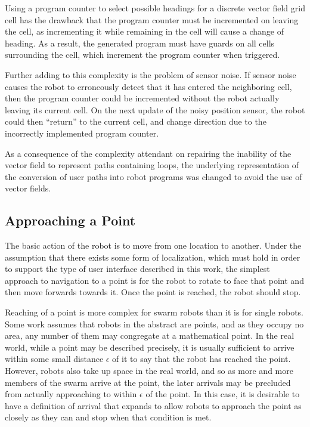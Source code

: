 Using a program counter to select possible headings for a discrete vector field grid cell has the drawback that the program counter must be incremented on leaving the cell, as incrementing it while remaining in the cell will cause a change of heading.
As a result, the generated program must have guards on all cells surrounding the cell, which increment the program counter when triggered. 

Further adding to this complexity is the problem of sensor noise. 
If sensor noise causes the robot to erroneously detect that it has entered the neighboring cell, then the program counter could be incremented without the robot actually leaving its current cell. 
On the next update of the noisy position sensor, the robot could then ``return'' to the current cell, and change direction due to the incorrectly implemented program counter. 

As a consequence of the complexity attendant on repairing the inability of the vector field to represent paths containing loops, the underlying representation of the conversion of user paths into robot programs was changed to avoid the use of vector fields. 

\subsection{Approaching a Point}

The basic action of the robot is to move from one location to another. 
Under the assumption that there exists some form of localization, which must hold in order to support the type of user interface described in this work, the simplest approach to navigation to a point is for the robot to rotate to face that point and then move forwards towards it. Once the point is reached, the robot should stop. 

Reaching of a point is more complex for swarm robots than it is for single robots. 
Some work assumes that robots in the abstract are points, and as they occupy no area, any number of them may congregate at a mathematical point. 
In the real world, while a point may be described precisely, it is usually sufficient to arrive within some small distance $\epsilon$ of it to say that the robot has reached the point. 
However, robots also take up space in the real world, and so as more and more members of the swarm arrive at the point, the later arrivals may be precluded from actually approaching to within $\epsilon$ of the point.
In this case, it is desirable to have a definition of arrival that expands to allow robots to approach the point as closely as they can and stop when that condition is met. 

